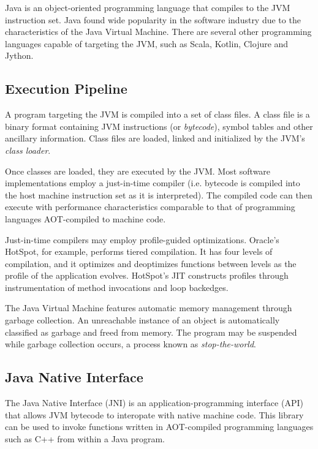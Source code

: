 Java is an object-oriented programming language that compiles to the JVM instruction set. Java found wide popularity in the software industry due to the characteristics of the Java Virtual Machine. There are several other programming languages capable of targeting the JVM, such as Scala, Kotlin, Clojure and Jython.

\subsection{Execution Pipeline}

A program targeting the JVM is compiled into a set of class files. A class file is a binary format containing JVM instructions (or \emph{bytecode}), symbol tables and other ancillary information. Class files are loaded, linked and initialized by the JVM's \emph{class loader}.

Once classes are loaded, they are executed by the JVM. Most software implementations employ a just-in-time compiler (i.e. bytecode is compiled into the host machine instruction set as it is interpreted). The compiled code can then execute with performance characteristics comparable to that of programming languages AOT-compiled to machine code.

Just-in-time compilers may employ profile-guided optimizations. Oracle's HotSpot, for example, performs tiered compilation. It has four levels of compilation, and it optimizes and deoptimizes functions between levels as the profile of the application evolves. HotSpot's JIT constructs profiles through instrumentation of method invocations and loop backedges.

The Java Virtual Machine features automatic memory management through garbage collection. An unreachable instance of an object is automatically classified as garbage and freed from memory. The program may be suspended while garbage collection occurs, a process known as \emph{stop-the-world}.



\subsection{Java Native Interface}

The Java Native Interface (JNI) is an application-programming interface (API) that allows JVM bytecode to interopate with native machine code. This library can be used to invoke functions written in AOT-compiled programming languages such as C++ from within a Java program.

